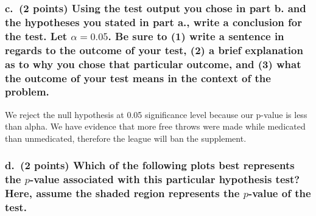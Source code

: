 \documentclass[
]{article}
\begin{document}
\hypertarget{c.-2-points-using-the-test-output-you-chose-in-part-b.-and-the-hypotheses-you-stated-in-part-a.-write-a-conclusion-for-the-test.-let-alpha-0.05.-be-sure-to-1-write-a-sentence-in-regards-to-the-outcome-of-your-test-2-a-brief-explanation-as-to-why-you-chose-that-particular-outcome-and-3-what-the-outcome-of-your-test-means-in-the-context-of-the-problem.}{%
\subsubsection{\texorpdfstring{c.~(2 points) Using the test output you
chose in part b. and the hypotheses you stated in part a., write a
conclusion for the test. Let \(\alpha = 0.05\). Be sure to (1) write a
sentence in regards to the outcome of your test, (2) a brief explanation
as to why you chose that particular outcome, and (3) what the outcome of
your test means in the context of the
problem.}{c.~(2 points) Using the test output you chose in part b. and the hypotheses you stated in part a., write a conclusion for the test. Let \textbackslash alpha = 0.05. Be sure to (1) write a sentence in regards to the outcome of your test, (2) a brief explanation as to why you chose that particular outcome, and (3) what the outcome of your test means in the context of the problem.}}\label{c.-2-points-using-the-test-output-you-chose-in-part-b.-and-the-hypotheses-you-stated-in-part-a.-write-a-conclusion-for-the-test.-let-alpha-0.05.-be-sure-to-1-write-a-sentence-in-regards-to-the-outcome-of-your-test-2-a-brief-explanation-as-to-why-you-chose-that-particular-outcome-and-3-what-the-outcome-of-your-test-means-in-the-context-of-the-problem.}}

We reject the null hypothesis at 0.05 significance level because our
p-value is less than alpha. We have evidence that more free throws were
made while medicated than unmedicated, therefore the league will ban the
supplement.

\hypertarget{d.-2-points-which-of-the-following-plots-best-represents-the-p-value-associated-with-this-particular-hypothesis-test-here-assume-the-shaded-region-represents-the-p-value-of-the-test.}{%
\subsubsection{\texorpdfstring{d.~(2 points) Which of the following
plots best represents the \(p\)-value associated with this particular
hypothesis test? Here, assume the shaded region represents the
\(p\)-value of the
test.}{d.~(2 points) Which of the following plots best represents the p-value associated with this particular hypothesis test? Here, assume the shaded region represents the p-value of the test.}}\label{d.-2-points-which-of-the-following-plots-best-represents-the-p-value-associated-with-this-particular-hypothesis-test-here-assume-the-shaded-region-represents-the-p-value-of-the-test.}}
\end{document}
